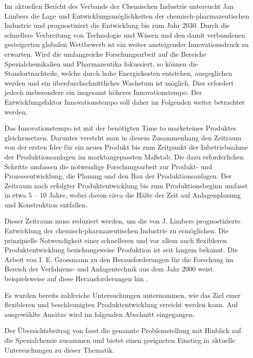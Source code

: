 Im aktuellen Bericht des Verbands der Chemischen Industrie  untersucht Jan Limbers die Lage und Entwicklungsm\"oglichkeiten der chemisch-pharmazeutischen Industrie und prognostiziert die Entwicklung bis zum Jahr 2030. Durch die schnellere Verbreitung von Technologie und Wissen und den damit verbundenen gesteigerten globalen Wettbewerb ist ein weiter ansteigender Innovationsdruck zu erwarten. Wird die umfangreiche Forschungsarbeit auf die Bereiche Spezialchemikalien und Pharmazeutika fokussiert, so k\"onnen die Standortnachteile, welche durch hohe Energiekosten entstehen, ausgeglichen werden und ein \"uberdurchschnittliches Wachstum ist m\"oglich. Dies erfordert jedoch insbesondere ein insgesamt h\"oheres Innovationstempo. Der Entwicklungsfaktor Innovationstempo soll daher im Folgenden weiter betrachtet werden. \cite{PerspektiveC_2016}

Das Innovationstempo ist mit der ben\"otigten \glqq Time to market\grqq { }eines Produktes gleichzusetzen. Darunter versteht man in diesem Zusammenhang den Zeitraum von der ersten Idee f\"ur ein neues Produkt bis zum Zeitpunkt der Inbetriebnahme der Produktionsanlagen im marktangepassten Ma\ss{}stab. Die dazu erforderlichen Schritte umfassen die notwendige Forschungsarbeit zur Produkt- und Prozessentwicklung, die Planung und den Bau der Produktionsanlagen. Der Zeitraum nach erfolgter Produktentwicklung bis zum Produktionsbeginn umfasst in etwa 5 -- 10 Jahre, wobei davon circa die H\"alte der Zeit auf Anlagenplanung und Konstruktion entfallen. \cite{Schembecker_2009}

Dieser Zeitraum muss reduziert werden, um die von J. Limbers prognostizierte Entwicklung der chemisch-pharmazeutischen Industrie zu erm\"oglichen. \linebreak
Die prinzipielle Notwendigkeit einer schnelleren und vor allem auch flexibleren Produktentwicklung beziehungsweise Produktion ist seit langem bekannt. Die Arbeit von I. E. Grossmann zu den Herausforderungen f\"ur die Forschung im Bereich der Verfahrens- und Anlagentechnik aus dem Jahr 2000 weist beispielsweise auf diese Herausforderungen hin \cite{Grossmann_2000}.

Es wurden bereits zahlreiche Untersuchungen unternommen, wie das Ziel einer flexibleren und  beschleunigten Produktentwicklung erreicht werden kann. Auf ausgew\"ahlte Ans\"atze wird im folgenden Abschnitt eingegangen.

Der \"Ubersichtsbeitrag von \citeauthor{Wachsen_2015} \cite{Wachsen_2015} fasst die genannte Problemstellung mit Hinblick auf die Spezialchemie zusammen und bietet einen geeigneten Einstieg in aktuelle Untersuchungen zu dieser Thematik. 

